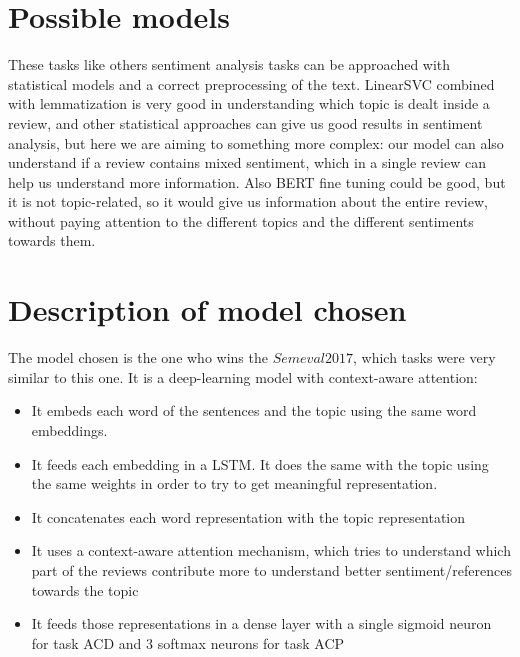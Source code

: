 \documentclass{article}
\begin{document}
    \section{Possible models}\label{sec:s2}
        These tasks like others sentiment analysis tasks can be approached with statistical models and a correct preprocessing of the text.
        LinearSVC combined with lemmatization is very good in understanding which topic is dealt inside a review, and other statistical approaches can give us good results in sentiment analysis, but here we are aiming to something more complex: our model can also understand if a review contains mixed sentiment, which in a single review can help us understand more information.
        Also BERT fine tuning could be good, but it is not topic-related, so it would give us information about the entire review, without paying attention to the different topics and the different sentiments towards them.

    \section{Description of model chosen}\label{sec:s3}
        The model chosen is the one who wins the $Semeval2017$, which tasks were very similar to this one.
        It is a deep-learning model with context-aware attention:
        \begin{itemize}
            \item It embeds each word of the sentences and the topic using the same word embeddings.
            \item It feeds each embedding in a LSTM. It does the same with the topic using the same weights in order to try to get meaningful representation.
            \item It concatenates each word representation with the topic representation
            \item It uses a context-aware attention mechanism, which tries to understand which part of the reviews contribute more to understand better sentiment/references towards the topic
            \item It feeds those representations in a dense layer with a single sigmoid neuron for task ACD and 3 softmax neurons for task ACP
        \end{itemize}
\end{document}
